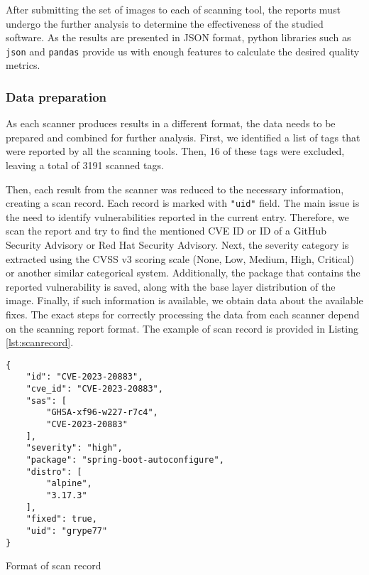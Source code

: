 After submitting the set of images to each of scanning tool, the reports must undergo the further analysis to determine the effectiveness of the studied software. As the results are presented in JSON format, python libraries such as \texttt{json} and \texttt{pandas} provide us with enough features to calculate the desired quality metrics. 

\subsubsection*{Data preparation}

As each scanner produces results in a different format, the data needs to be prepared and combined for further analysis. First, we identified a list of tags that were reported by all the scanning tools. Then, 16 of these tags were excluded, leaving a total of 3191 scanned tags.

Then, each result from the scanner was reduced to the necessary information, creating a scan record. Each record is marked with \texttt{"uid"} field. The main issue is the need to identify vulnerabilities reported in the current entry. Therefore, we scan the report and try to find the mentioned CVE ID or ID of a GitHub Security Advisory or Red Hat Security Advisory. Next, the severity category is extracted using the CVSS v3 scoring scale (None, Low, Medium, High, Critical) or another similar categorical system. Additionally, the package that contains the reported vulnerability is saved, along with the base layer distribution of the image. Finally, if such information is available, we obtain data about the available fixes. The exact steps for correctly processing the data from each scanner depend on the scanning report format. The example of scan record is provided in Listing \ref{lst:scanrecord}.


\begin{listing}[htp]
    \centering
    \begin{minipage}{0.7\linewidth}
        \begin{verbatim}
{
    "id": "CVE-2023-20883",
    "cve_id": "CVE-2023-20883",
    "sas": [
        "GHSA-xf96-w227-r7c4",
        "CVE-2023-20883"
    ],
    "severity": "high",
    "package": "spring-boot-autoconfigure",
    "distro": [
        "alpine",
        "3.17.3"
    ],
    "fixed": true,
    "uid": "grype77"
}
        \end{verbatim}
    \end{minipage}
    \caption{Format of scan record}
    \label{lst:scanrecord}
\end{listing}

